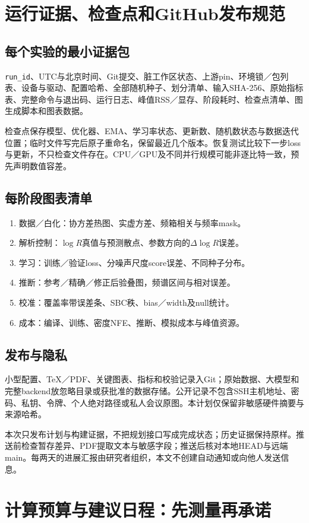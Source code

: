 \documentclass[UTF8,fontset=none,a4paper,11pt]{ctexart}
\newcommand{\code}[1]{\texttt{\nolinkurl{#1}}}
\begin{document}
\section{运行证据、检查点和GitHub发布规范}
\subsection{每个实验的最小证据包}
\code{run_id}、UTC与北京时间、Git提交、脏工作区状态、上游pin、环境锁／包列表、设备与驱动、配置哈希、全部随机种子、划分清单、输入SHA-256、原始指标表、完整命令与退出码、运行日志、峰值RSS／显存、阶段耗时、检查点清单、图生成脚本和图表数据。

检查点保存模型、优化器、EMA、学习率状态、更新数、随机数状态与数据迭代位置；临时文件写完后原子重命名，保留最近几个版本。恢复测试比较下一步loss与更新，不只检查文件存在。CPU／GPU及不同并行规模可能非逐比特一致，预先声明数值容差。
\subsection{每阶段图表清单}
\begin{enumerate}
\item 数据／白化：协方差热图、实虚方差、频箱相关与频率mask。
\item 解析控制：$\log R$真值与预测散点、参数方向的$\Delta\log R$误差。
\item 学习：训练／验证loss、分噪声尺度score误差、不同种子分布。
\item 推断：参考／精确／修正后验叠图，频谱区间与相对误差。
\item 校准：覆盖率带误差条、SBC秩、bias／width及null统计。
\item 成本：编译、训练、密度NFE、推断、模拟成本与峰值资源。
\end{enumerate}
\subsection{发布与隐私}
小型配置、TeX／PDF、关键图表、指标和校验记录入Git；原始数据、大模型和完整backend放忽略目录或获批准的数据存储。公开记录不包含SSH主机地址、密码、私钥、令牌、个人绝对路径或私人会议原图。本计划仅保留非敏感硬件摘要与来源哈希。

本次只发布计划与构建证据，不把规划接口写成完成状态；历史证据保持原样。推送前检查暂存差异、PDF提取文本与敏感字段；推送后核对本地HEAD与远端main。每两天的进展汇报由研究者组织，本文不创建自动通知或向他人发送信息。
\clearpage

\section{计算预算与建议日程：先测量再承诺}
\end{document}
